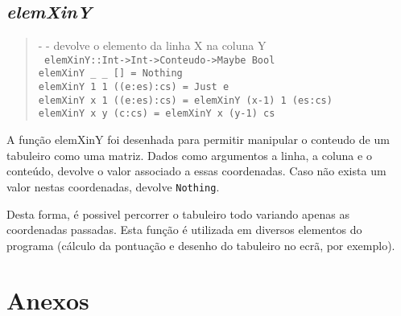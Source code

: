 \documentclass[a4paper,titlepage]{scrreprt}
\begin{document}
	\section{{\it elemXinY}}
		\begin{quote}
			{\small - - devolve o elemento da linha X na coluna Y\\}
			{\tt
			elemXinY::Int->Int->Conteudo->Maybe Bool\\
			elemXinY \_ \_ [] = Nothing\\
			elemXinY 1 1 ((e:es):cs) = Just e\\
			elemXinY x 1 ((e:es):cs) = elemXinY (x-1) 1 (es:cs)\\
			elemXinY x y (c:cs) = elemXinY x (y-1) cs
			}
		\end{quote}
	A função elemXinY foi desenhada para permitir manipular o conteudo de um tabuleiro como uma matriz. Dados como argumentos a linha,
	a coluna e o conteúdo, devolve o valor associado a essas coordenadas. Caso não exista um valor nestas coordenadas, devolve
	{\tt Nothing}.
	
	Desta forma, é possivel percorrer o tabuleiro todo variando apenas as coordenadas passadas. Esta função é utilizada em diversos
	elementos do programa (cálculo da pontuação e desenho do tabuleiro no ecrã, por exemplo).
\chapter{Anexos}
\end{document}
